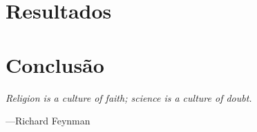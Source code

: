 \documentclass[
	12pt,				  %
	openright,	  %
	oneside,			%
	a4paper,			%
	english,			%
	french,				%
	spanish,			%
	brazil				%
	]{abntex2}
\begin{document}
\chapter{Resultados}
\label{ch:resultados}



\chapter{Conclusão}
\label{ch:conclusao}

\epigraph{\itshape Religion is a culture of faith; science is a culture of doubt.}{---Richard Feynman}













\postextual



%
%



%
%
%
%
%
%
%
%
%
%
\end{document}
